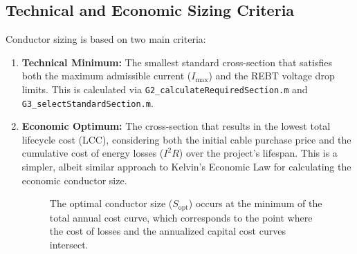 \documentclass[12pt, a4paper]{article}
\begin{document}
\subsection{Technical and Economic Sizing Criteria}
Conductor sizing is based on two main criteria:
\begin{enumerate}
    \item \textbf{Technical Minimum:} The smallest standard cross-section that satisfies both the maximum admissible current ($I_{\text{max}}$) and the REBT voltage drop limits. This is calculated via \texttt{G2\_calculateRequiredSection.m} and \texttt{G3\_selectStandardSection.m}.
    \item \textbf{Economic Optimum:} The cross-section that results in the lowest total lifecycle cost (LCC), considering both the initial cable purchase price and the cumulative cost of energy losses ($I^2R$) over the project's lifespan. This is a simpler, albeit similar approach to Kelvin's Economic Law for calculating the economic conductor size.
    
    \begin{figure}[h!]
    \centering
    \caption{The optimal conductor size ($S_{\text{opt}}$) occurs at the minimum of the total annual cost curve, which corresponds to the point where the cost of losses and the annualized capital cost curves intersect.}
\end{figure}
\end{enumerate}
\end{document}
